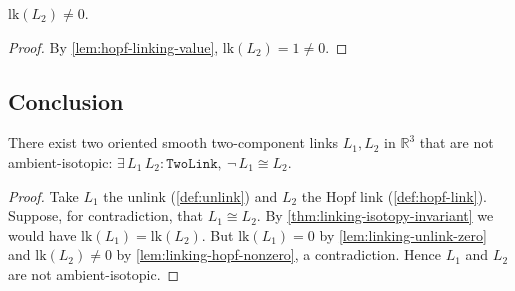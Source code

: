 \begin{lemma}
    \label{lem:linking-hopf-nonzero}
    $\mathrm{lk}(L_2) \neq 0$.
\end{lemma}
\begin{proof}
    By \cref{lem:hopf-linking-value}, $\mathrm{lk}(L_2) = 1 \neq 0$.
\end{proof}

\subsection{Conclusion}

\begin{theorem}
    \label{thm:exists-nonisotopic-link}
    There exist two oriented smooth two-component links $L_1, L_2$ in
    $\mathbb{R}^3$ that are not ambient-isotopic:
    $\exists\, L_1\, L_2 : \texttt{TwoLink},\ \neg\, L_1 \cong L_2$.
\end{theorem}
\begin{proof}
    Take $L_1$ the unlink (\cref{def:unlink}) and $L_2$ the Hopf link
    (\cref{def:hopf-link}). Suppose, for contradiction, that $L_1 \cong L_2$. By
    \cref{thm:linking-isotopy-invariant} we would have
    $\mathrm{lk}(L_1) = \mathrm{lk}(L_2)$. But $\mathrm{lk}(L_1) = 0$ by
    \cref{lem:linking-unlink-zero} and $\mathrm{lk}(L_2)\neq 0$ by
    \cref{lem:linking-hopf-nonzero}, a contradiction. Hence $L_1$ and $L_2$ are not
    ambient-isotopic.
\end{proof}


